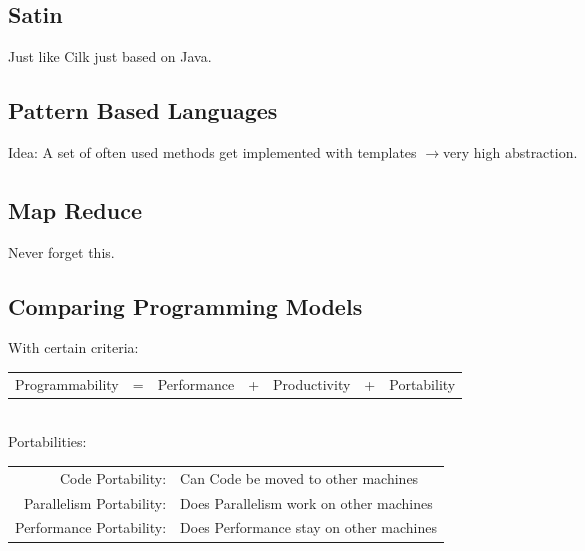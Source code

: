 \documentclass[a4paper]{article}
\newcommand{\arrow}{$\xrightarrow[]{}$}
\begin{document}
\subsection{Satin}
Just like Cilk just based on Java.

\subsection{Pattern Based Languages}
Idea: A set of often used methods get implemented with templates \arrow very high abstraction.

\subsection{Map Reduce}
Never forget this.

\subsection{Comparing Programming Models}
With certain criteria:\\
{\bf \begin{tabular}{ccccccc}
 Programmability &=&Performance&+&Productivity&+&Portability
\end{tabular}}\\
Portabilities:\\
\begin{tabular}{rl}
Code Portability:&Can Code be moved to other machines\\
Parallelism Portability:& Does Parallelism work on other machines\\
Performance Portability:&Does Performance stay on other machines\\
\end{tabular}
\end{document}
